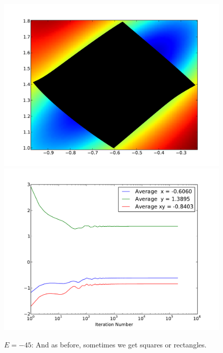 \documentclass[letterpaper]{article}
\begin{document}
\begin{figure}[p]
\begin{center}
\includegraphics[width=5in]{p1.pdf}
\includegraphics[width=5in]{p1a.pdf}
\end{center}
\caption{$E=-45$: And as before, sometimes we get squares or rectangles.}
\label{fig:p1}
\end{figure}

\newpage 
\clearpage

\end{document}
